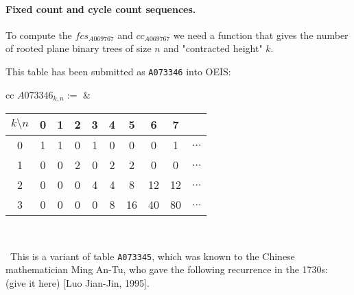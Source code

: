 \documentclass[11pt]{article} %
\newcommand{\autname}[1]{{\it *#1}}
\newcommand{\automorphism}[1]{automorphism~\autname{#1}}
\newcommand{\EISseq}[1]{{\tt #1}}
\begin{document}
\paragraph{Fixed count and cycle count sequences.}

To compute the $fcs_{A069767}$ and $cc_{A069767}$ we need a function
that gives the number of rooted plane binary trees of size $n$ and "contracted height" $k$.

This table has been submitted as \EISseq{A073346} into OEIS:
\begin{center}
\begin{tabular}{cc}
$A073346_{k,n} := $ &
\begin{tabular}{c|ccccccccc}
$k \setminus n$ &
        0 & 1 & 2 & 3 &  4 &  5 & 6 &  7 & \\
\hline
0     & 1 & 1 & 0 & 1 & 0 &  0 &  0 &  1 & $\hdots$ \\
1     & 0 & 0 & 2 & 0 & 2 &  2 &  0 &  0 & $\hdots$ \\
2     & 0 & 0 & 0 & 4 & 4 &  8 & 12 & 12 & $\hdots$ \\
3     & 0 & 0 & 0 & 0 & 8 & 16 & 40 & 80 & $\hdots$ \\
\end{tabular}
\\
\end{tabular}
\end{center}

\
This is a variant of table \EISseq{A073345}, which was known to the Chinese mathematician Ming An-Tu,
who gave the following recurrence in the 1730s: (give it here)
[Luo Jian-Jin, 1995].
\end{document}
